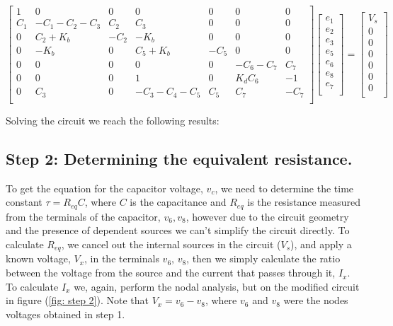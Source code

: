 $\begin{bmatrix}
1  &  0 &  0 &  0 & 0 & 0 & 0 \\
C_1 & -C_1-C_2-C_3 & C_2 & C_3 & 0 & 0 & 0\\
0 & C_2+K_b & -C_2 & -K_b & 0 & 0 & 0\\
0 & -K_b & 0 & C_5+K_b & -C_5 & 0 & 0\\
0 & 0 & 0 & 0 & 0 & -C_6-C_7 & C_7\\
0 & 0 & 0 & 1 & 0 & K_d C_6 & -1\\
0 & C_3 & 0 & -C_3-C_4-C_5 & C_5 & C_7 & -C_7\\ 
\end{bmatrix}
\begin{bmatrix}
e_1\\
e_2\\
e_3\\
e_5\\
e_6\\
e_8\\
e_7\\
\end{bmatrix}
=
\begin{bmatrix}
V_s\\
0\\
0\\
0\\
0\\
0\\
0\\
\end{bmatrix}$
\vspace{1.0cm}

Solving the circuit we reach the following results:
\vspace{1.0cm}



\subsection{Step 2: Determining the equivalent resistance.}
To get the equation for the capacitor voltage, $v_c$, we need to determine the time constant $\tau = R_{eq}C$, where $C$ is the capacitance and $R_{eq}$ is the resistance measured from the terminals of the capacitor, $v_6, v_8$, however due to the circuit geometry and the presence of dependent sources we can't simplify the circuit directly. To calculate $R_{eq}$, we cancel out the internal sources in the circuit ($V_s$), and apply a known voltage, $V_x$, in the terminals $v_6,\, v_8$, then we simply calculate the ratio between  the voltage from the source and the current that passes through it, $I_x$. To calculate $I_x$ we, again, perform the nodal analysis, but on the modified circuit in figure (\ref{fig: step 2}). Note that $V_x = v_6-v_8$, where $v_6$ and $v_8$ were the nodes voltages obtained in step 1. 

